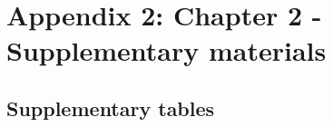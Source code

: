 \chapter[Appendix 2: Chapter 2 - Supplementary materials]{Appendix 2: Chapter 2 - Supplementary materials}\label{ch:Appendix2.1}

\renewcommand{\thefigure}{A.2.\arabic{figure}}
\setcounter{figure}{0}

\renewcommand{\thetable}{A.2.\arabic{table}}
\setcounter{table}{0}

\section*{Supplementary tables}

